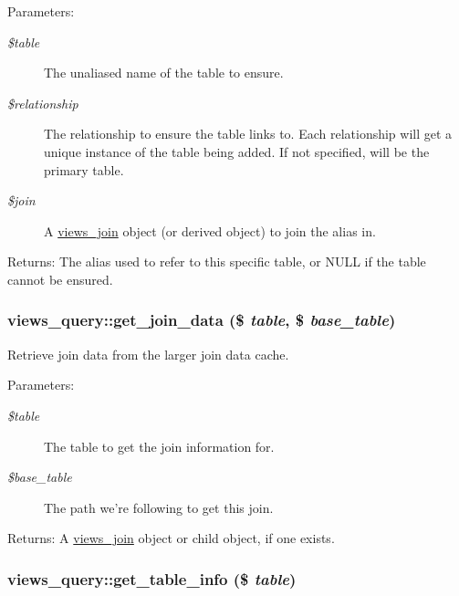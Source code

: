 \begin{Desc}
\item[Parameters:]
\begin{description}
\item[{\em \$table}]The unaliased name of the table to ensure. \item[{\em \$relationship}]The relationship to ensure the table links to. Each relationship will get a unique instance of the table being added. If not specified, will be the primary table. \item[{\em \$join}]A \hyperlink{classviews__join}{views\_\-join} object (or derived object) to join the alias in.\end{description}
\end{Desc}
\begin{Desc}
\item[Returns:]The alias used to refer to this specific table, or NULL if the table cannot be ensured. \end{Desc}
\hypertarget{classviews__query_de77e3ef670bde3a2eacf8d73f5859fa}{
\subsubsection[{get\_\-join\_\-data}]{\setlength{\rightskip}{0pt plus 5cm}views\_\-query::get\_\-join\_\-data (\$ {\em table}, \/  \$ {\em base\_\-table})}}
\label{classviews__query_de77e3ef670bde3a2eacf8d73f5859fa}


Retrieve join data from the larger join data cache.

\begin{Desc}
\item[Parameters:]
\begin{description}
\item[{\em \$table}]The table to get the join information for. \item[{\em \$base\_\-table}]The path we're following to get this join.\end{description}
\end{Desc}
\begin{Desc}
\item[Returns:]A \hyperlink{classviews__join}{views\_\-join} object or child object, if one exists. \end{Desc}
\hypertarget{classviews__query_e4b476ae432575dab501ed30b5421b7d}{
\subsubsection[{get\_\-table\_\-info}]{\setlength{\rightskip}{0pt plus 5cm}views\_\-query::get\_\-table\_\-info (\$ {\em table})}}
\label{classviews__query_e4b476ae432575dab501ed30b5421b7d}



